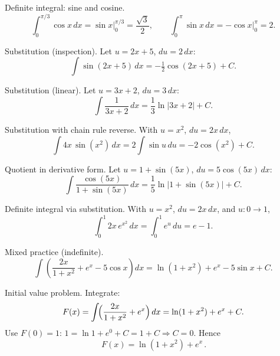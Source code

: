 \documentclass[11pt]{article}
\def\textbf#1{#1}%
\begin{document}
\begin{solution}
\textbf{Definite integral: sine and cosine.}
\[
\int_{0}^{\pi/3}\!\cos x\,dx=\sin x\Big|_{0}^{\pi/3}=\frac{\sqrt3}{2},
\qquad
\int_{0}^{\pi}\!\sin x\,dx=-\cos x\Big|_{0}^{\pi}=2 .
\]
\end{solution}

\begin{solution}
\textbf{Substitution (inspection).}
Let $u=2x+5$, $du=2\,dx$:
\[
\int \sin(2x+5)\,dx=-\tfrac12\cos(2x+5)+C .
\]
\end{solution}

\begin{solution}
\textbf{Substitution (linear).}
Let $u=3x+2$, $du=3\,dx$:
\[
\int \frac{1}{3x+2}\,dx=\frac{1}{3}\ln|3x+2|+C .
\]
\end{solution}

\begin{solution}
\textbf{Substitution with chain rule reverse.}
With $u=x^{2}$, $du=2x\,dx$,
\[
\int 4x\,\sin(x^{2})\,dx=2\int \sin u\,du=-2\cos(x^{2})+C .
\]
\end{solution}

\begin{solution}
\textbf{Quotient in derivative form.}
Let $u=1+\sin(5x)$, $du=5\cos(5x)\,dx$:
\[
\int \frac{\cos(5x)}{1+\sin(5x)}\,dx=\frac{1}{5}\ln|1+\sin(5x)|+C .
\]
\end{solution}

\begin{solution}
\textbf{Definite integral via substitution.}
With $u=x^{2}$, $du=2x\,dx$, and $u:0\to 1$,
\[
\int_{0}^{1}2x\,e^{x^{2}}\,dx=\int_{0}^{1} e^{u}\,du=e-1 .
\]
\end{solution}

\begin{solution}
\textbf{Mixed practice (indefinite).}
\[
\int \left( \frac{2x}{1+x^{2}} + e^{x} - 5\cos x \right)\!dx
=\ln(1+x^{2})+e^{x}-5\sin x+C .
\]
\end{solution}

\begin{solution}
\textbf{Initial value problem.}
Integrate:
\[
F(x)=\int \!\Bigl(\frac{2x}{1+x^{2}}+e^{x}\Bigr)\,dx
=\ln(1+x^{2})+e^{x}+C.
\]
Use $F(0)=1$: $1=\ln 1+e^{0}+C=1+C \Rightarrow C=0$. Hence
\[
\boxed{\,F(x)=\ln(1+x^{2})+e^{x}\, }.
\]
\end{solution}
\end{document}
